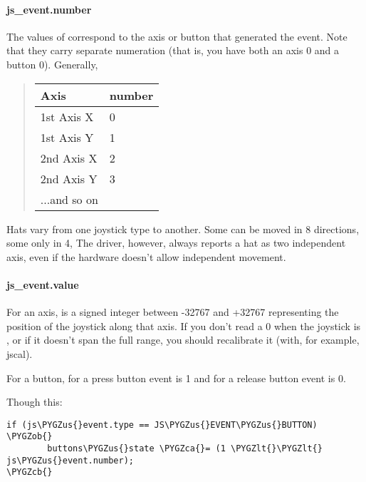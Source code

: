 \documentclass[a4paper,8pt,english]{sphinxmanual}
\def\PYGZus{\char`\_}
\def\PYGZob{\char`\{}
\def\PYGZcb{\char`\}}
\def\PYGZca{\char`\^}
\def\PYGZlt{\char`\<}
\begin{document}
\paragraph{js\_event.number}
\label{input/joydev/joystick-api:js-event-number}
The values of  correspond to the axis or button that
generated the event. Note that they carry separate numeration (that
is, you have both an axis 0 and a button 0). Generally,
\begin{quote}

\begin{tabulary}{\linewidth}{|L|L|}
\hline
\textsf{\relax 
Axis
} & \textsf{\relax 
number
}\\
\hline
1st Axis X
 & 
0
\\
\hline
1st Axis Y
 & 
1
\\
\hline
2nd Axis X
 & 
2
\\
\hline
2nd Axis Y
 & 
3
\\
\hline
...and so on
 & \\
\hline\end{tabulary}

\end{quote}

Hats vary from one joystick type to another. Some can be moved in 8
directions, some only in 4, The driver, however, always reports a hat as two
independent axis, even if the hardware doesn't allow independent movement.


\paragraph{js\_event.value}
\label{input/joydev/joystick-api:js-event-value}
For an axis,  is a signed integer between -32767 and +32767
representing the position of the joystick along that axis. If you
don't read a 0 when the joystick is , or if it doesn't span the
full range, you should recalibrate it (with, for example, jscal).

For a button,  for a press button event is 1 and for a release
button event is 0.

Though this:

\begin{Verbatim}[commandchars=\\\{\}]
if (js\PYGZus{}event.type == JS\PYGZus{}EVENT\PYGZus{}BUTTON) \PYGZob{}
        buttons\PYGZus{}state \PYGZca{}= (1 \PYGZlt{}\PYGZlt{} js\PYGZus{}event.number);
\PYGZcb{}
\end{Verbatim}
\end{document}
